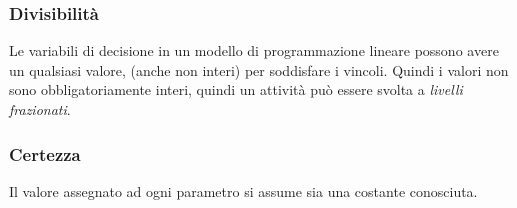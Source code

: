 \documentclass{article}
\begin{document}
      \subsubsection{Divisibilità}
        Le variabili di decisione in un modello di programmazione lineare possono avere un qualsiasi valore, (anche non interi) per soddisfare i vincoli. Quindi i valori non sono obbligatoriamente interi, quindi un attività può essere svolta a \textit{livelli frazionati}.

      \subsubsection{Certezza}
        Il valore assegnato ad ogni parametro si assume sia una costante conosciuta.
\end{document}
